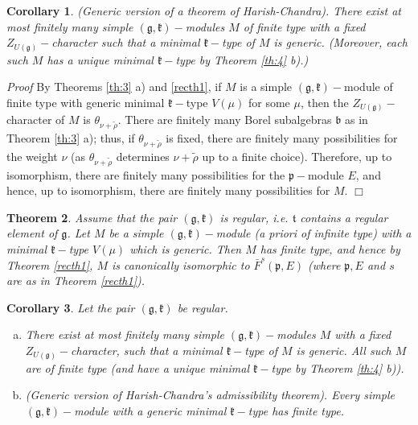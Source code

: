 \documentclass[10pt]{amsart}
\newtheorem{theo}{Theorem}[section]
\newtheorem{cor}[theo]{Corollary}
\renewenvironment{proof}{ \emph{Proof}}{$\Box$}
\newcommand{\bb}{\mathfrak{b}}
\renewcommand{\gg}{\mathfrak{g}}
\newcommand{\kk}{\mathfrak{k}}
\newcommand{\pp}{\mathfrak{p}}
\renewcommand{\tt}{\mathfrak{t}}
\begin{document}
\begin{cor}\label{corr1_pz2}
 (Generic version of a theorem of Harish-Chandra). There exist at most finitely many simple $(\gg,\kk)-$modules $M$ of finite type with a fixed $Z_{U(\gg)}-$character such that a minimal $\kk-$type of $M$ is generic. (Moreover, each such $M$ has a unique minimal $\kk-$type by Theorem \ref{th:4} b).)
\end{cor}

\begin{proof}
 By Theorems \ref{th:3} a) and \ref{recth1}, if $M$ is a simple $(\gg,\kk)-$module of finite type with generic minimal $\kk-$type $V(\mu)$ for some $\mu$, then the $Z_{U(\gg)}-$character of $M$ is $\theta_{\nu + \tilde{\rho}}$. There are finitely many Borel subalgebras $\bb$ as in Theorem \ref{th:3} a); thus, if $\theta_{\nu + \tilde{\rho}}$ is fixed, there are finitely many possibilities for the weight $\nu$ (as $\theta_{\nu + \tilde{\rho}}$ determines $\nu + \tilde{\rho}$ up to a finite choice). Therefore, up to isomorphism, there are finitely many possibilities for the $\pp-$module $E$, and hence, up to isomorphism, there are finitely many possibilities for $M$.
\end{proof}

\begin{theo}\label{recth2}
 Assume that the pair $(\gg,\kk)$ is regular, i.e. $\tt$ contains a regular element of $\gg$. Let $M$ be a simple $(\gg,\kk)-$module (a priori of infinite type) with a minimal $\kk-$type $V(\mu)$ which is generic. Then $M$ has finite type, and hence by Theorem \ref{recth1}, $M$ is canonically isomorphic to $\bar{F}^s(\pp,E)$ (where $\pp,E$ and $s$ are as in Theorem \ref{recth1}).
\end{theo}

\begin{cor}\label{corr2_pz2}
 Let the pair $(\gg,\kk)$ be regular.
 \begin{enumerate}[a)]
  \item There exist at most finitely many simple $(\gg,\kk)-$modules $M$ with a fixed $Z_{U(\gg)}-$character, such that a minimal $\kk-$type of $M$ is generic. All such $M$ are of finite type (and have a unique minimal $\kk-$type by Theorem \ref{th:4} b)).
  \item (Generic version of Harish-Chandra's admissibility theorem). Every simple $(\gg,\kk)-$module with a generic minimal $\kk-$type has finite type.
 \end{enumerate}
\end{cor}
\end{document}
